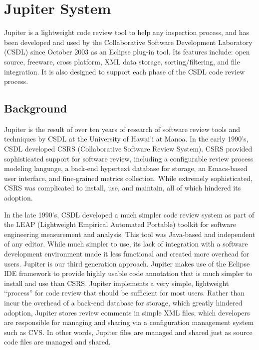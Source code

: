 \chapter{Jupiter System}
\label{ch:jupiter-system}

Jupiter is a lightweight code review tool to help any inspection process, and has been developed and used by the Collaborative Software Development Laboratory (CSDL) since October 2003 as an Eclipse plug-in tool. Its features include: open source, freeware, cross platform, XML data storage, sorting/filtering, and file integration. It is also designed to support each phase of the CSDL code review process.

\section{Background}
\label{sec:background}

Jupiter is the result of over ten years of research of software review tools and techniques by CSDL at the University of Hawai'i at Manoa. In the early 1990's, CSDL developed CSRS (Collaborative Software Review System). CSRS provided sophisticated support for software review, including a configurable review process modeling language, a back-end hypertext database for storage, an Emacs-based user interface, and fine-grained metrics collection. While extremely sophisticated, CSRS was complicated to install, use, and maintain, all of which hindered its adoption.

In the late 1990's, CSDL developed a much simpler code review system as part of the LEAP (Lightweight Empirical Automated Portable) toolkit for software engineering measurement and analysis. This tool was Java-based and independent of any editor.  While much simpler to use, its lack of integration with a software development environment made it less functional and created more overhead for users. Jupiter is our third generation approach. Jupiter makes use of the Eclipse IDE framework to provide highly usable code annotation that is much simpler to install and use than CSRS. Jupiter implements a very simple, lightweight ``process'' for code review that should be sufficient for most users.  Rather than incur the overhead of a back-end database for storage, which greatly hindered adoption, Jupiter stores review comments in simple XML files, which developers are responsible for managing and sharing via a configuration management system such as CVS. In other words, Jupiter files are managed and shared just as source code files are managed and shared.

